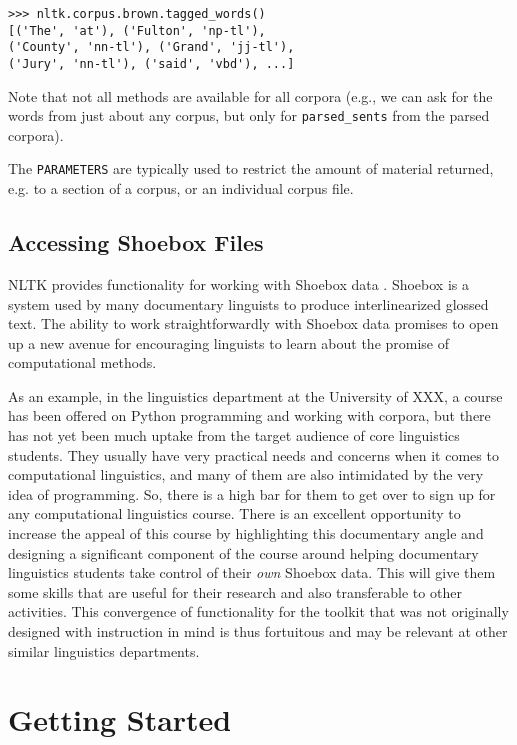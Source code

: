 \documentclass[11pt]{article}
\newcommand{\code}[1]{\texttt{\small #1}}
\begin{document}
{\small\begin{verbatim}
>>> nltk.corpus.brown.tagged_words()
[('The', 'at'), ('Fulton', 'np-tl'),
('County', 'nn-tl'), ('Grand', 'jj-tl'),
('Jury', 'nn-tl'), ('said', 'vbd'), ...]
\end{verbatim}}

Note that not all methods are available for all corpora (e.g., we can
ask for the words from just about any corpus, but only for
\code{parsed\_sents} from the parsed corpora).

The \code{PARAMETERS} are typically used to restrict the amount of material returned,
e.g. to a section of a corpus, or an individual corpus file.

\subsection{Accessing Shoebox Files}

NLTK provides functionality for working with Shoebox data
\cite{robinson:etal:2007}. Shoebox is a system used by many
documentary linguists to produce interlinearized glossed text.  The
ability to work straightforwardly with Shoebox data promises to open
up a new avenue for encouraging linguists to learn about the promise
of computational methods. 

As an example, in the linguistics department at the University of
XXX, a course has been offered on Python programming and
working with corpora, but there has not yet been much uptake from the
target audience of core linguistics students. They usually have very
practical needs and concerns when it comes to computational
linguistics, and many of them are also intimidated by the very idea of
programming. So, there is a high bar for them to get over to sign up
for any computational linguistics course. There is an excellent
opportunity to increase the appeal of this course by highlighting this
documentary angle and designing a significant component of the course
around helping documentary linguistics students take control of their
{\it own} Shoebox data. This will give them some skills that are
useful for their research and also transferable to other activities.
This convergence of functionality for the toolkit that was not
originally designed with instruction in mind is thus fortuitous and
may be relevant at other similar linguistics departments.

\section{Getting Started}
\label{sec:getting-started}
\end{document}
